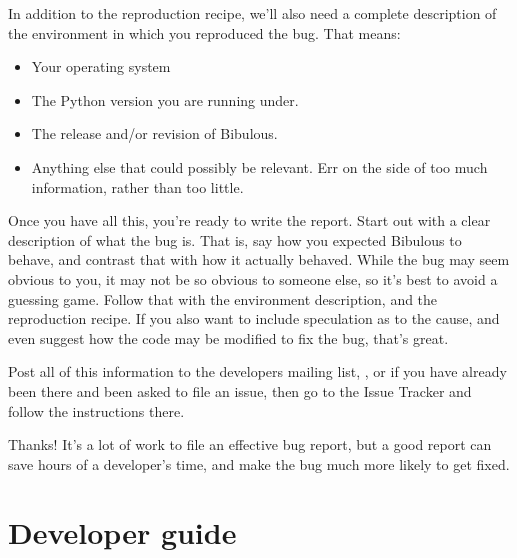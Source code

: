 \documentclass[letterpaper,10pt,english]{sphinxmanual}
\begin{document}
In addition to the reproduction recipe, we’ll also need a complete description of the environment in which you reproduced the bug. That means:
\begin{itemize}
\item {} 
Your operating system

\item {} 
The Python version you are running under.

\item {} 
The release and/or revision of Bibulous.

\item {} 
Anything else that could possibly be relevant. Err on the side of too much information, rather than too little.

\end{itemize}

Once you have all this, you’re ready to write the report. Start out with a clear description of what the bug is. That is, say how you expected Bibulous to behave, and contrast that with how it actually behaved. While the bug may seem obvious to you, it may not be so obvious to someone else, so it’s best to avoid a guessing game. Follow that with the environment description, and the reproduction recipe. If you also want to include speculation as to the cause, and even suggest how the code may be modified to fix the bug, that’s great.

Post all of this information to the developers mailing list, , or if you have already been there and been asked to file an issue, then go to the Issue Tracker and follow the instructions there.

Thanks! It’s a lot of work to file an effective bug report, but a good report can save hours of a developer’s time, and make the bug much more likely to get fixed.


\chapter{Developer guide}
\label{\detokenize{developer_guide:developer-guide}}\label{\detokenize{developer_guide::doc}}
\end{document}
